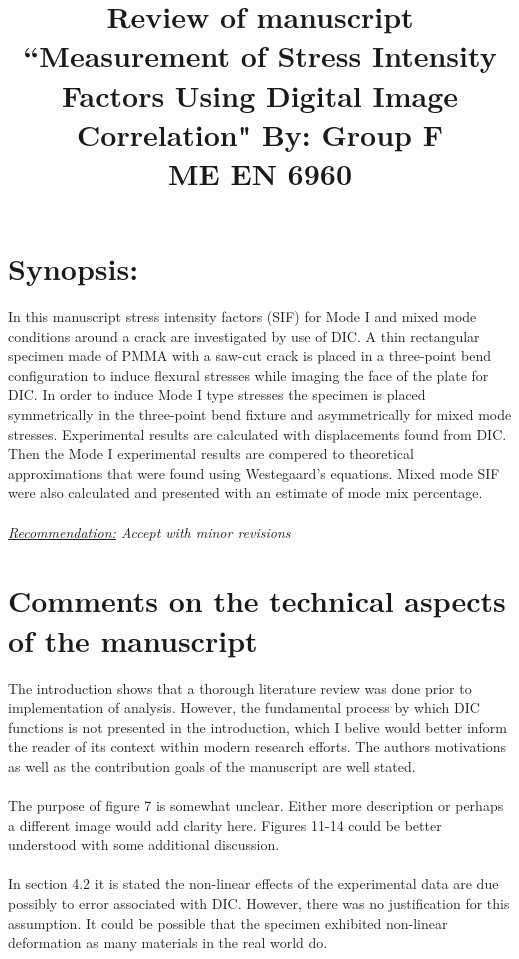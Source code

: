 \documentclass[12pt]{article}
\begin{document}
\title{ Review of manuscript ``Measurement of Stress Intensity Factors Using Digital Image Correlation" By: Group F\\ \normalsize{ME EN 6960}}
\maketitle


\section*{Synopsis:} 
In this manuscript stress intensity factors (SIF) for Mode I and mixed mode conditions around a crack are investigated by use of DIC. A  thin rectangular specimen made of PMMA with a saw-cut crack is placed in a three-point bend configuration to induce flexural stresses while imaging the face of the plate for DIC. In order to induce Mode I type stresses the specimen is placed symmetrically in the three-point bend fixture and asymmetrically for mixed mode stresses.  Experimental results are calculated with displacements found from DIC. Then the Mode I experimental results are compered to theoretical approximations that were found using Westegaard's equations. Mixed mode SIF were  also calculated and presented with an estimate of mode mix percentage.
\\ 
\\
\textit{\underline{Recommendation:} Accept with minor revisions}

\section*{Comments on the technical aspects of the manuscript}
The introduction shows that a thorough literature review was done prior to implementation of analysis. However, the fundamental process by which  DIC functions is not presented in the introduction, which I belive would better inform the reader of its context within modern research efforts. The authors motivations as well as the contribution goals of the manuscript are well stated. 
 \\
 \\
 The purpose of figure 7 is somewhat unclear. Either more description or perhaps a different image would add clarity here. Figures 11-14 could be better understood with some additional discussion. 
 \\
 \\
 In section 4.2 it is stated the non-linear effects of the experimental data are due possibly to error associated with DIC. However, there was no justification for this assumption.  It could be possible that the specimen exhibited non-linear deformation as many materials in the real world do. 
\end{document}
